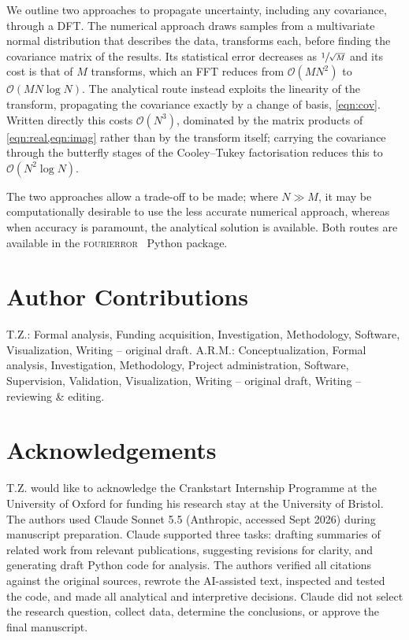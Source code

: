 \documentclass[reprint,
               superscriptaddress,
               nobibnotes,
               amsmath,
               amssymb,
               aps,
               hidelinks, 
               pre]{revtex4-2}
\begin{document}
We outline two approaches to propagate uncertainty, including any covariance, through a DFT.
The numerical approach draws samples from a multivariate normal distribution that describes the data, transforms each, before finding the covariance matrix of the results. 
Its statistical error decreases as $\sfrac{1}{\sqrt{M}}$ and its cost is that of $M$ transforms, which an FFT reduces from $\mathcal{O}(M N^2)$ to $\mathcal{O}(M N \log N)$. 
The analytical route instead exploits the linearity of the transform, propagating the covariance exactly by a change of basis, \cref{eqn:cov}. 
Written directly this costs $\mathcal{O}(N^3)$, dominated by the matrix products of \cref{eqn:real,eqn:imag} rather than by the transform itself; carrying the covariance through the butterfly stages of the Cooley--Tukey factorisation reduces this to $\mathcal{O}(N^2 \log N)$.

The two approaches allow a trade-off to be made; where $N\gg M$, it may be computationally desirable to use the less accurate numerical approach, whereas when accuracy is paramount, the analytical solution is available. 
Both routes are available in the \textsc{fourierror}~\cite{FourierrorGithub} Python package. 

\section*{Author Contributions}

T.Z.: Formal analysis, Funding acquisition, Investigation, Methodology, Software, Visualization, Writing – original draft.
A.R.M.: Conceptualization, Formal analysis, Investigation, Methodology, Project administration, Software, Supervision, Validation, Visualization, Writing – original draft, Writing – reviewing \& editing. \\

\section*{Acknowledgements}

T.Z. would like to acknowledge the Crankstart Internship Programme at the University of Oxford for funding his research stay at the University of Bristol.
The authors used Claude Sonnet 5.5 (Anthropic, accessed Sept 2026) during manuscript preparation.
Claude supported three tasks: drafting summaries of related work from relevant publications, suggesting revisions for clarity, and generating draft Python code for analysis.
The authors verified all citations against the original sources, rewrote the AI-assisted text, inspected and tested the code, and made all analytical and interpretive decisions.
Claude did not select the research question, collect data, determine the conclusions, or approve the final manuscript.
\end{document}

